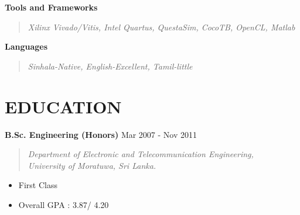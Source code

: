 \documentclass[mm]{res} %
\begin{document}
\begin{resume}
\textbf{Tools and Frameworks}
\begin{quote}
	\emph{Xilinx Vivado/Vitis, Intel Quartus, QuestaSim, CocoTB, OpenCL, Matlab}
	\end{quote}
	
\textbf{Languages}
\begin{quote}
	\emph{Sinhala-Native, English-Excellent, Tamil-little}
\end{quote}





\section{EDUCATION}


\textbf{B.Sc. Engineering (Honors)} \hfill Mar 2007 - Nov 2011
\begin{quote}
\emph{Department of Electronic and Telecommunication Engineering, \\
University of Moratuwa, Sri Lanka.}
\end{quote}

\begin{itemize} \itemsep -1pt %
\item First Class
\item Overall GPA : 3.87/ 4.20
\end{itemize}

%


\end{resume}
\end{document}

